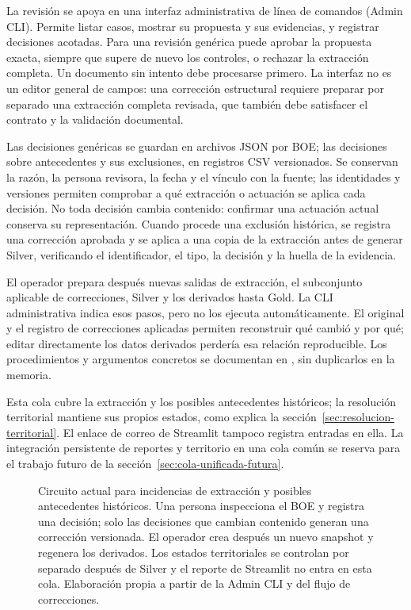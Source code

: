 La revisión se apoya en una interfaz administrativa de línea de comandos
(Admin CLI). Permite listar casos, mostrar su propuesta y sus evidencias,
y registrar decisiones acotadas. Para una revisión genérica puede aprobar
la propuesta exacta, siempre que supere de nuevo los controles, o rechazar
la extracción completa. Un documento sin intento debe procesarse primero.
La interfaz no es un editor general de campos: una corrección estructural
requiere preparar por separado una extracción completa revisada, que también
debe satisfacer el contrato y la validación documental.

Las decisiones genéricas se guardan en archivos JSON por BOE; las decisiones
sobre antecedentes y sus exclusiones, en registros CSV versionados. Se
conservan la razón, la persona revisora, la fecha y el vínculo con la fuente;
las identidades y versiones permiten comprobar a qué extracción o actuación
se aplica cada decisión. No toda decisión cambia contenido: confirmar una
actuación actual conserva su representación. Cuando procede una exclusión
histórica, se registra una corrección aprobada y se aplica a una copia de la
extracción antes de generar Silver, verificando el identificador, el tipo,
la decisión y la huella de la evidencia.

El operador prepara después nuevas salidas de extracción, el subconjunto
aplicable de correcciones, Silver y los derivados hasta Gold. La CLI
administrativa indica esos pasos, pero no los ejecuta automáticamente.
El original y el registro de correcciones aplicadas permiten reconstruir
qué cambió y por qué; editar directamente los datos derivados perdería esa
relación reproducible. Los procedimientos y argumentos concretos se
documentan en , sin duplicarlos en la memoria.

Esta cola cubre la extracción y los posibles antecedentes históricos; la
resolución territorial mantiene sus
propios estados, como explica la sección~\ref{sec:resolucion-territorial}.
El enlace de correo de Streamlit tampoco registra entradas en ella. La
integración persistente de reportes y territorio en una cola común se reserva
para el trabajo futuro de la sección~\ref{sec:cola-unificada-futura}.

\begin{figure}[p]
\centering

\caption[Revisión y corrección humana implementadas]{Circuito actual para
incidencias de extracción y posibles antecedentes históricos. Una persona
inspecciona el BOE y registra una decisión; solo las decisiones que cambian
contenido generan una corrección versionada. El operador crea después un nuevo
snapshot y regenera los derivados. Los estados territoriales se controlan por
separado después de Silver y el reporte de Streamlit no entra en esta cola.
Elaboración propia a partir de la Admin CLI y del flujo de correcciones.}
\label{fig:revision-correcciones}
\end{figure}

